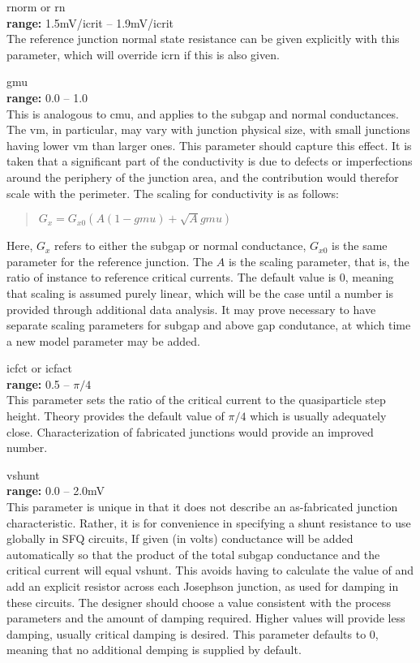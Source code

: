 \begin{description}
\item{{\vt rnorm} or {\vt rn}}\\
{\bf range:} 1.5mV/{\vt icrit} -- 1.9mV/{\vt icrit}\\
The reference junction normal state resistance can be given explicitly
with this parameter, which will override {\vt icrn} if this is also
given.

\item{\vt gmu}\\
{\bf range:} 0.0 -- 1.0\\
This is analogous to {\vt cmu}, and applies to the subgap and normal
conductances.  The {\vt vm}, in particular, may vary with junction
physical size, with small junctions having lower {\vt vm} than larger
ones.  This parameter should capture this effect.  It is taken that a
significant part of the conductivity is due to defects or
imperfections around the periphery of the junction area, and the
contribution would therefor scale with the perimeter.  The scaling for
conductivity is as follows:
\begin{quote}
$G_x = G_{x0} (A(1-gmu) + \sqrt{A} gmu)$
\end{quote}
Here, $G_x$ refers to either the subgap or normal conductance,
$G_{x0}$ is the same parameter for the reference junction.  The $A$ is
the scaling parameter, that is, the ratio of instance to reference
critical currents.  The default value is 0, meaning that scaling is
assumed purely linear, which will be the case until a number is
provided through additional data analysis.  It may prove necessary to
have separate scaling parameters for subgap and above gap condutance,
at which time a new model parameter may be added.

\item{{\vt icfct} or {\vt icfact}}\\
{\bf range:} 0.5 -- ${\pi}/4$\\
This parameter sets the ratio of the critical current to the
quasiparticle step height.  Theory provides the default value of
$\pi/4$ which is usually adequately close.  Characterization of
fabricated junctions would provide an improved number.

\item{\vt vshunt}\\
{\bf range:} 0.0 -- 2.0mV\\
This parameter is unique in that it does not describe an as-fabricated
junction characteristic.  Rather, it is for convenience in specifying
a shunt resistance to use globally in SFQ circuits, If given (in
volts) conductance will be added automatically so that the product of
the total subgap conductance and the critical current will equal {\vt
vshunt}.  This avoids having to calculate the value of and add an
explicit resistor across each Josephson junction, as used for damping
in these circuits.  The designer should choose a value consistent with
the process parameters and the amount of damping required.  Higher
values will provide less damping, usually critical damping is desired. 
This parameter defaults to 0, meaning that no additional demping is
supplied by default.


\end{description}
